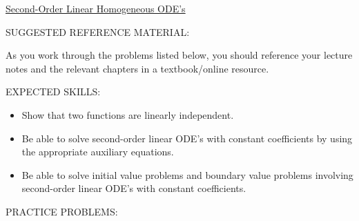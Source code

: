 \documentclass[12pt]{article}
\begin{document}
\begin{center}
\underline{\LARGE{Second-Order Linear Homogeneous ODE's}}
\end{center}

\noindent SUGGESTED REFERENCE MATERIAL:

\medskip

\noindent As you work through the problems listed below, you should reference your lecture notes and the relevant chapters in a textbook/online resource.

\bigskip

\noindent EXPECTED SKILLS:

\medskip

\begin{itemize}[topsep=0pt]

\item Show that two functions are linearly independent.

\item Be able to solve second-order linear ODE's with constant coefficients by using the appropriate auxiliary equations.

\item Be able to solve initial value problems and boundary value problems involving second-order linear ODE's with constant coefficients.

\end{itemize}

\bigskip

\noindent PRACTICE PROBLEMS:
\end{document}
